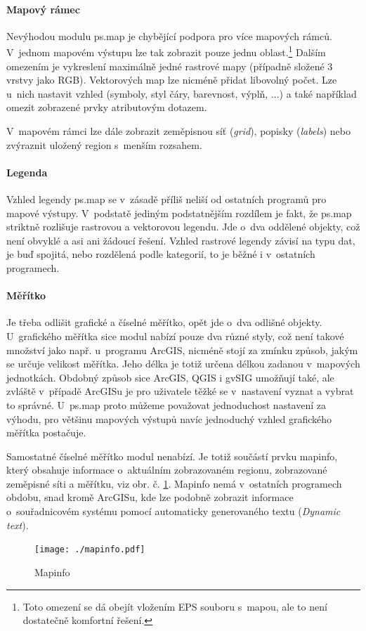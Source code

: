 \documentclass[a4paper,12pt,draft]{article}
\begin{document}
\paragraph*{Mapový rámec}
Nevýhodou modulu ps.map je chybějící podpora pro více mapových
rámců. V~jednom mapovém výstupu lze tak zobrazit pouze jednu
oblast.\footnote{Toto omezení se dá obejít vložením EPS souboru s~mapou,
ale to není dostatečně komfortní řešení.} Dalším omezením je
vykreslení maximálně jedné rastrové mapy (případně složené 3 vrstvy
jako RGB). Vektorových map lze nicméně přidat libovolný počet. Lze
u~nich nastavit vzhled (symboly, styl čáry, barevnost, výplň, ...) a také
například omezit zobrazené prvky atributovým dotazem.

V~mapovém rámci lze dále zobrazit zeměpisnou síť (\emph{grid}), popisky
(\emph{labels}) nebo zvýraznit uložený region s~menším rozsahem.

\paragraph*{Legenda}
Vzhled legendy ps.map se v~zásadě příliš neliší od ostatních
programů pro mapové výstupy. V~podstatě jediným podstatnějším rozdílem
je fakt, že
ps.map striktně rozlišuje rastrovou a vektorovou legendu. Jde o~dva
oddělené objekty, což není obvyklé a asi ani žádoucí řešení. Vzhled
rastrové legendy závisí na typu dat, je buď spojitá, nebo rozdělená
podle kategorií, to je běžné i v~ostatních programech.

\paragraph*{Měřítko}
Je třeba odlišit grafické a číselné měřítko, opět jde o~dva
odlišné objekty.
U~grafického měřítka sice modul nabízí pouze dva různé styly, což není takové
množství jako např. u~programu
 ArcGIS, nicméně stojí za zmínku způsob,
jakým se určuje velikost měřítka. Jeho délka je totiž určena 
délkou zadanou v~mapových jednotkách. Obdobný způsob sice 
ArcGIS, QGIS i gvSIG 
umožňují také, ale zvláště v~případě ArcGISu je pro uživatele
těžké se v~nastavení vyznat a vybrat to správné. U~ps.map proto
můžeme považovat jednoduchost nastavení za výhodu, pro většinu mapových
výstupů navíc jednoduchý vzhled grafického měřítka postačuje.

Samostatné číselné měřítko modul nenabízí. Je totiž součástí
prvku mapinfo, který obsahuje informace o~aktuálním
zobrazovaném regionu, zobrazované zeměpisné síti a měřítku, viz
obr. č. \ref{fig:mapinfo}. Mapinfo nemá v~ostatních programech obdobu,
snad kromě ArcGISu, kde lze podobně zobrazit informace o~souřadnicovém
systému pomocí automaticky generovaného textu (\emph{Dynamic text}).
\begin{figure}[h!]
    \centering
    \texttt{[image: ./mapinfo.pdf]}
    \caption{Mapinfo}
    \label{fig:mapinfo}
\end{figure}
\end{document}
